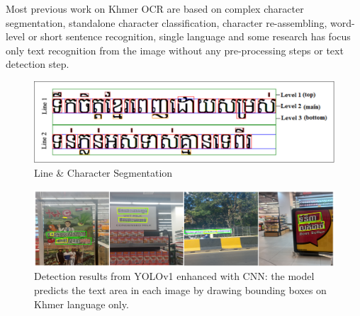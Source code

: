 Most previous work on Khmer OCR are based on complex character segmentation,
standalone character classification, character re-assembling,
word-level or short sentence recognition, single language and some research has focus only
text recognition from the image without any pre-processing steps or text
detection step.

\begin{figure}[H]
  \centering
  \includegraphics[width=\textwidth]{figures/khmer_char_segmentation.png}
  \caption{Line \& Character Segmentation \citet{Sok&Taing2014}}
  \label{fig:khmer_character_segmentation}
\end{figure}

\begin{figure}[H]
  \centering
  \includegraphics[width=\textwidth]{figures/single_language_only.png}
  \caption{Detection results from YOLOv1 enhanced with CNN: 
  the model predicts the text area in each image by 
  drawing bounding boxes on Khmer language only. \citet{nom2024khmerst}}
  \label{fig:single_language_only}
\end{figure}


